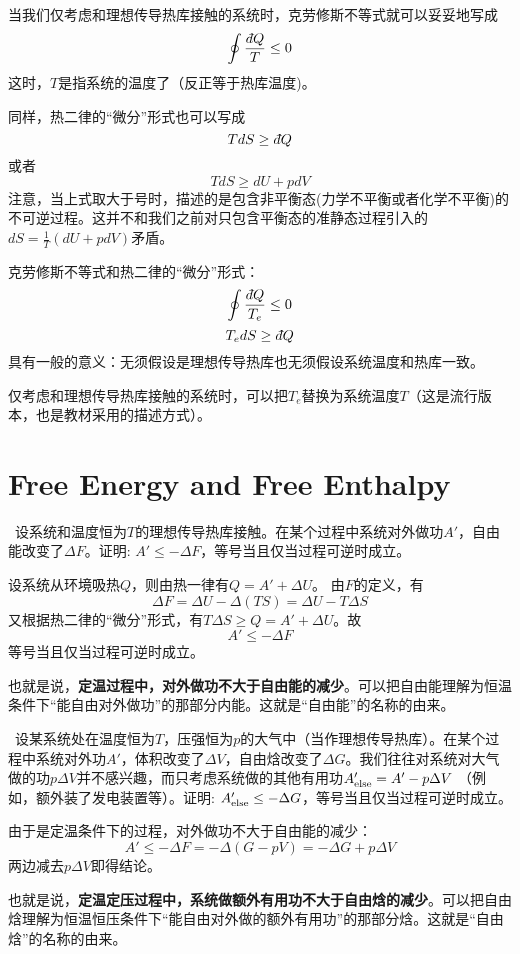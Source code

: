 \documentclass[CJK]{beamer}
\begin{document}
\begin{frame}
\bch
当我们{\blue 仅考虑和理想传导热库接触的系统}时，克劳修斯不等式就可以妥妥地写成
{\blue $$\oint \frac{\dbar Q}{T} \le 0 $$}
这时，$T$是指系统的温度了（反正等于热库温度\wulian)。

同样，热二律的“微分”形式也可以写成{\blue
$$ TdS \ge \dbar Q $$}
或者{\blue
$$ TdS \ge dU + pdV $$}
{\small 注意，当上式取大于号时，描述的是包含非平衡态(力学不平衡或者化学不平衡)的不可逆过程。这并不和我们之前对只包含平衡态的准静态过程引入的$ dS = \frac{1}{T}\left(dU + pdV\right)$矛盾。}

\ech
\end{frame}


\begin{frame}
\bch
克劳修斯不等式和热二律的“微分”形式：
{\blue $$\oint \frac{\dbar Q}{T_e} \le 0 $$
$$ T_edS \ge \dbar Q $$}
具有一般的意义：无须假设是理想传导热库也无须假设系统温度和热库一致。

\skipline

仅考虑和理想传导热库接触的系统时，可以把$T_e$替换为系统温度$T$（这是流行版本，也是教材采用的描述方式）。
\ech
\end{frame}


\section{Free Energy and Free Enthalpy}

\begin{frame}
\bch
{\small
{\blue  设系统和温度恒为$T$的理想传导热库接触。在某个过程中系统对外做功$A'$，自由能改变了$\Delta F$。证明: $A'\le -\Delta F$，等号当且仅当过程可逆时成立。}

设系统从环境吸热$Q$，则由热一律有$Q = A' + \Delta U$。
由$F$的定义，有
$$\Delta F = \Delta U - \Delta (TS) = \Delta U - T\Delta S $$
又根据热二律的“微分”形式，有$T\Delta S \ge Q = A' +\Delta U$。故
$$A' \le - \Delta F$$
等号当且仅当过程可逆时成立。

也就是说，{\bf 定温过程中，对外做功不大于自由能的减少}。可以把自由能理解为恒温条件下“能自由对外做功”的那部分内能。这就是“自由能”的名称的由来。
}

\ech
\end{frame}

\begin{frame}
\bch

{\blue  设某系统处在温度恒为$T$，压强恒为$p$的大气中（当作理想传导热库）。在某个过程中系统对外功$A'$，体积改变了$\Delta V$，自由焓改变了$\Delta G$。我们往往对系统对大气做的功$p\Delta V$并不感兴趣，而只考虑系统做的其他有用功$A'_{\rm else} = A'-p\Delta V$ （例如，额外装了发电装置等）。证明: $A'_{\rm else}  \le -\Delta G$，等号当且仅当过程可逆时成立。}

由于是定温条件下的过程，对外做功不大于自由能的减少：
$$ A' \le - \Delta F = -\Delta (G- pV) = - \Delta G + p \Delta V$$
两边减去$p\Delta V$即得结论。

也就是说，{\bf 定温定压过程中，系统做额外有用功不大于自由焓的减少}。可以把自由焓理解为恒温恒压条件下“能自由对外做的额外有用功”的那部分焓。这就是“自由焓”的名称的由来。

\ech
\end{frame}
\end{document}
